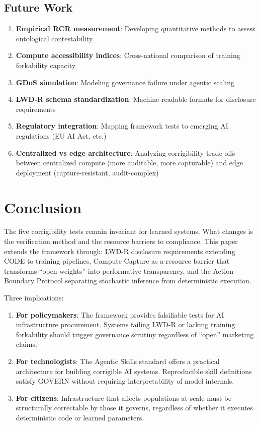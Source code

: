 \documentclass[11pt,a4paper]{article}
\theoremstyle{definition}
\begin{document}
\subsection{Future Work}

\begin{enumerate}[noitemsep]
    \item \textbf{Empirical RCR measurement}: Developing quantitative methods to assess ontological contestability
    \item \textbf{Compute accessibility indices}: Cross-national comparison of training forkability capacity
    \item \textbf{GDoS simulation}: Modeling governance failure under agentic scaling
    \item \textbf{LWD-R schema standardization}: Machine-readable formats for disclosure requirements
    \item \textbf{Regulatory integration}: Mapping framework tests to emerging AI regulations (EU AI Act, etc.)
    \item \textbf{Centralized vs edge architecture}: Analyzing corrigibility trade-offs between centralized compute (more auditable, more capturable) and edge deployment (capture-resistant, audit-complex)
\end{enumerate}

\section{Conclusion}

The five corrigibility tests remain invariant for learned systems. What changes is the verification method and the resource barriers to compliance. This paper extends the framework through: LWD-R disclosure requirements extending CODE to training pipelines, Compute Capture as a resource barrier that transforms ``open weights'' into performative transparency, and the Action Boundary Protocol separating stochastic inference from deterministic execution.

Three implications:

\begin{enumerate}[noitemsep]
    \item \textbf{For policymakers}: The framework provides falsifiable tests for AI infrastructure procurement. Systems failing LWD-R or lacking training forkability should trigger governance scrutiny regardless of ``open'' marketing claims.

    \item \textbf{For technologists}: The Agentic Skills standard offers a practical architecture for building corrigible AI systems. Reproducible skill definitions satisfy GOVERN without requiring interpretability of model internals.

    \item \textbf{For citizens}: Infrastructure that affects populations at scale must be structurally correctable by those it governs, regardless of whether it executes deterministic code or learned parameters.
\end{enumerate}
\end{document}
